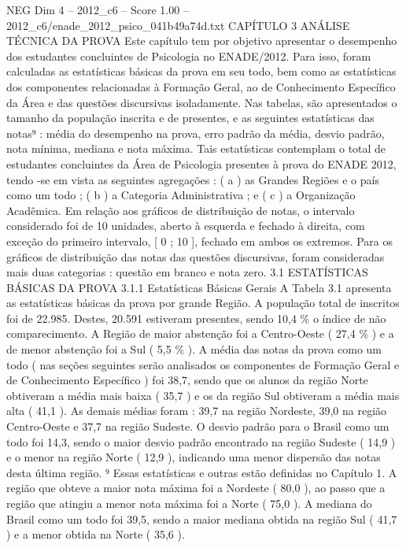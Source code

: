 \begin{textsample}{NEG Dim 4 – 2012\_c6 – Score 1.00 – 2012\_c6/enade\_2012\_psico\_041b49a74d.txt}  \label{ex:f4_neg_236}
CAPÍTULO 3 ANÁLISE TÉCNICA DA PROVA Este capítulo tem por objetivo apresentar o desempenho dos estudantes concluintes de Psicologia no ENADE/2012.
Para isso, foram calculadas as estatísticas básicas da prova em seu todo, bem como as estatísticas dos componentes relacionadas à Formação Geral, ao de Conhecimento Específico da Área e das questões discursivas isoladamente.
Nas tabelas, são apresentados o tamanho da população inscrita e de presentes, e as seguintes estatísticas das notas⁹ : média do desempenho na prova, erro padrão da média, desvio padrão, nota mínima, mediana e nota máxima.
Tais estatísticas contemplam o total de estudantes concluintes da Área de Psicologia presentes à prova do ENADE 2012, tendo -se em vista as seguintes agregações : ( a ) as Grandes Regiões e o país como um todo ; ( b ) a Categoria Administrativa ; e ( c ) a Organização Acadêmica.
Em relação aos gráficos de distribuição de notas, o intervalo considerado foi de 10 unidades, aberto à esquerda e fechado à direita, com exceção do primeiro intervalo, [ 0 ; 10 ], fechado em ambos os extremos.
Para os gráficos de distribuição das notas das questões discursivas, foram consideradas mais duas categorias : questão em branco e nota zero. 3.1 ESTATÍSTICAS BÁSICAS DA PROVA 3.1.1 Estatísticas Básicas Gerais A Tabela 3.1 apresenta as estatísticas básicas da prova por grande Região.
A população total de inscritos foi de 22.985.
Destes, 20.591 estiveram presentes, sendo 10,4 \% o índice de não comparecimento.
A Região de maior abstenção foi a Centro-Oeste ( 27,4 \% ) e a de menor abstenção foi a Sul ( 5,5 \% ).
A média das notas da prova como um todo ( nas seções seguintes serão analisados os componentes de Formação Geral e de Conhecimento Específico ) foi 38,7, sendo que os alunos da região Norte obtiveram a média mais baixa ( 35,7 ) e os da região Sul obtiveram a média mais alta ( 41,1 ).
As demais médias foram : 39,7 na região Nordeste, 39,0 na região Centro-Oeste e 37,7 na região Sudeste.
O desvio padrão para o Brasil como um todo foi 14,3, sendo o maior desvio padrão encontrado na região Sudeste ( 14,9 ) e o menor na região Norte ( 12,9 ), indicando uma menor dispersão das notas desta última região. ⁹ Essas estatísticas e outras estão definidas no Capítulo 1.
A região que obteve a maior nota máxima foi a Nordeste ( 80,0 ), ao passo que a região que atingiu a menor nota máxima foi a Norte ( 75,0 ).
A mediana do Brasil como um todo foi 39,5, sendo a maior mediana obtida na região Sul ( 41,7 ) e a menor obtida na Norte ( 35,6 ).

\end{textsample}
